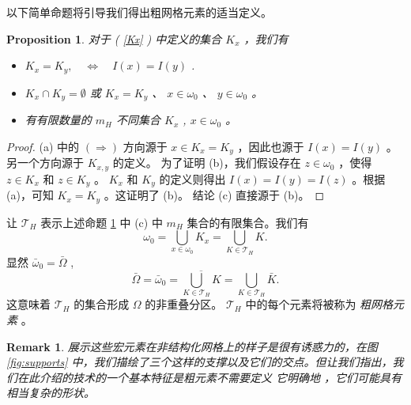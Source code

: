 \documentclass[12pt]{acta_2011xz}
\newtheorem{proposition}[theorem]{Proposition}
\newtheorem{remark}[theorem]{Remark}
\begin{document}
以下简单命题将引导我们得出粗网格元素的适当定义。
   \begin{proposition}   \label{prop:kx}    对于 (   \ref{Kx}   ) 中定义的集合    $K_x$   ，我们有
   \begin{itemize}   \item    [(a)]          $K_x=K_y, \quad \Leftrightarrow\quad I(x)=I(y)$          .
   \item    [(b)]          $K_x\cap K_y=\emptyset$          或          $K_x=K_y$          、          $x\in
\omega_0$          、          $y\in \omega_0$          。
   \item    [(c)] 有有限数量的          $m_H$          不同集合          $K_x$          , 
         $x\in \omega_0$          。  \end{itemize}     \end{proposition}   
   \begin{proof}(a) 中的    $(\Rightarrow)$    方向源于    $x\in
K_x=K_y$    ，因此也源于    $I(x)=I(y)$    。另一个方向源于    $K_{x,y}$    的定义。
为了证明 (b)，我们假设存在    $z\in \omega_0$    ，使得    $z\in K_x$    和    $z\in K_y$    。   $K_x$    和    $K_y$    的定义则得出    $I(x)=I(y)=I(z)$    。根据 (a)，可知    $K_x=K_y$    。这证明了 (b)。
结论 (c) 直接源于 (b)。  \end{proof}     

让    $\mathcal{T}_H$    表示上述命题    \ref{prop:kx}    中 (c) 中    $m_H$    集合的有限集合。我们有
   $$
\omega_0=\bigcup_{x\in \omega_0} K_x=\bigcup_{K\in \mathcal{T}_H} K. 
$$    显然    $\bar\omega_0=\bar\Omega$    ,
   \begin{equation}\label{EK}
\bar\Omega=\bar\omega_0=\overline{\bigcup_{K\in {\mathcal T}_H} K}
=\bigcup_{K\in {\mathcal T}_H} \bar K.
\end{equation}    这意味着    ${\mathcal T}_H$    的集合形成    $\Omega$    的非重叠分区。   ${\mathcal T}_H$    中的每个元素将被称为  {    \it    粗网格元素   }  。  

   \begin{remark}展示这些宏元素在非结构化网格上的样子是很有诱惑力的，在图    \ref{fig:supports}    中，我们描绘了三个这样的支撑以及它们的交点。但让我们指出，我们在此介绍的技术的一个基本特征是粗元素不需要定义  { 它明确地   } ，它们可能具有相当复杂的形状。  \end{remark}    
\end{document}
